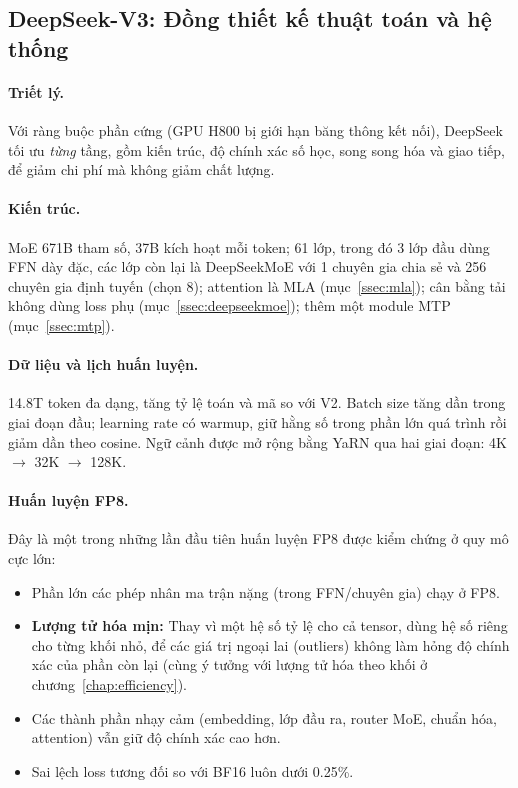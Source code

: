 \subsection{DeepSeek-V3: Đồng thiết kế thuật toán và hệ thống}
\label{ssec:deepseekv3_recipe}

\paragraph{Triết lý.} Với ràng buộc phần cứng (GPU H800 bị giới hạn băng thông kết nối), DeepSeek tối ưu \emph{từng} tầng, gồm kiến trúc, độ chính xác số học, song song hóa và giao tiếp, để giảm chi phí mà không giảm chất lượng.

\paragraph{Kiến trúc.} MoE 671B tham số, 37B kích hoạt mỗi token; 61 lớp, trong đó 3 lớp đầu dùng FFN dày đặc, các lớp còn lại là DeepSeekMoE với 1 chuyên gia chia sẻ và 256 chuyên gia định tuyến (chọn 8); attention là MLA (mục~\ref{ssec:mla}); cân bằng tải không dùng loss phụ (mục~\ref{ssec:deepseekmoe}); thêm một module MTP (mục~\ref{ssec:mtp}).

\paragraph{Dữ liệu và lịch huấn luyện.} 14.8T token đa dạng, tăng tỷ lệ toán và mã so với V2. Batch size tăng dần trong giai đoạn đầu; learning rate có warmup, giữ hằng số trong phần lớn quá trình rồi giảm dần theo cosine. Ngữ cảnh được mở rộng bằng YaRN qua hai giai đoạn: 4K $\rightarrow$ 32K $\rightarrow$ 128K.

\paragraph{Huấn luyện FP8.} Đây là một trong những lần đầu tiên huấn luyện FP8 được kiểm chứng ở quy mô cực lớn:
\begin{itemize}
	\item Phần lớn các phép nhân ma trận nặng (trong FFN/chuyên gia) chạy ở FP8.
	\item \textbf{Lượng tử hóa mịn:} Thay vì một hệ số tỷ lệ cho cả tensor, dùng hệ số riêng cho từng khối nhỏ, để các giá trị ngoại lai (outliers) không làm hỏng độ chính xác của phần còn lại (cùng ý tưởng với lượng tử hóa theo khối ở chương~\ref{chap:efficiency}).
	\item Các thành phần nhạy cảm (embedding, lớp đầu ra, router MoE, chuẩn hóa, attention) vẫn giữ độ chính xác cao hơn.
	\item Sai lệch loss tương đối so với BF16 luôn dưới 0.25\%.
\end{itemize}

